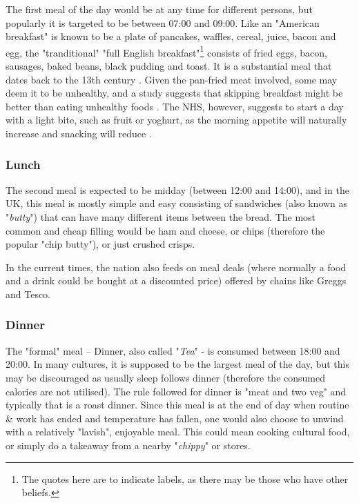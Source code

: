 \documentclass[../main.tex]{subfiles}
\begin{document}
The first meal of the day would be at any time for different persons, but popularly it is targeted to be between 07:00 and 09:00. Like an "American breakfast" is known to be a plate of pancakes, waffles, cereal, juice, bacon and egg, the "tranditional" "full English breakfast"\footnote{The quotes here are to indicate labels, as there may be those who have other beliefs.} consists of fried eggs, bacon, sausages, baked beans, black pudding and toast. It is a substantial meal that dates back to the 13th century \cite{HistoryTraditionalEnglish}. Given the pan-fried meat involved, some may deem it to be unhealthy, and a study suggests that skipping breakfast might be better than eating unhealthy foods \cite{pifferiCaloricRestrictionLongevity2019}. The NHS, however, suggests to start a day with a light bite, such as fruit or yoghurt, as the morning appetite will naturally increase and snacking will reduce \cite{HealthyBreakfastsPeople2018}.

\subsubsection{Lunch}

The second meal is expected to be midday (between 12:00 and 14:00), and in the UK, this meal is mostly simple and easy consisting of sandwiches (also known as "\textit{butty}") that can have many different items between the bread. The most common and cheap filling would be ham and cheese, or chips (therefore the popular "chip butty"), or just crushed crisps.

In the current times, the nation also feeds on meal deals (where normally a food and a drink could be bought at a discounted price) offered by chains like Greggs and Tesco.

\subsubsection{Dinner}

The "formal" meal -- Dinner, also called "\textit{Tea}" - is consumed between 18:00 and 20:00. In many cultures, it is supposed to be the largest meal of the day, but this may be discouraged as usually sleep follows dinner (therefore the consumed calories are not utilised). The rule followed for dinner is "meat and two veg" and typically that is a roast dinner. Since this meal is at the end of day when routine \& work has ended and temperature has fallen, one would also choose to unwind with a relatively "lavish", enjoyable meal. This could mean cooking cultural food, or simply do a takeaway from a nearby "\textit{chippy}" or stores.
\end{document}

